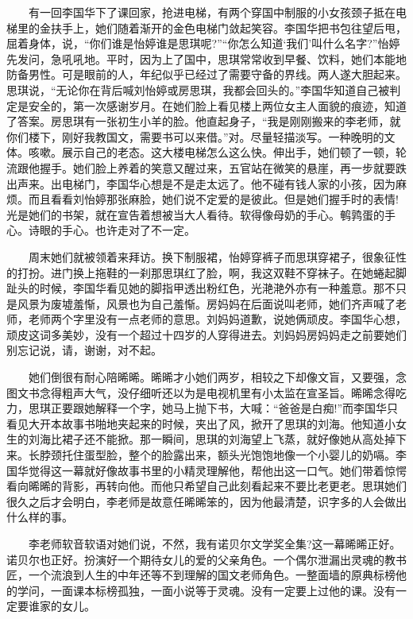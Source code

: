 \documentclass[12pt,UTF8]{ctexbook}
\begin{document}
　　有一回李国华下了课回家，抢进电梯，有两个穿国中制服的小女孩颈子抵在电梯里的金扶手上，她们随着渐开的金色电梯门敛起笑容。李国华把书包往望后甩，屈着身体，说，\enquote{你们谁是怡婷谁是思琪呢?}\enquote{你怎么知道`我们'叫什么名字?}怡婷先发问，急吼吼地。平时，因为上了国中，思琪常常收到早餐、饮料，她们本能地防备男性。可是眼前的人，年纪似乎已经过了需要守备的界线。两人遂大胆起来。思琪说，\enquote{无论你在背后喊刘怡婷或房思琪，我都会回头的。}李国华知道自己被判定是安全的，第一次感谢岁月。在她们脸上看见楼上两位女主人面貌的痕迹，知道了答案。房思琪有一张初生小羊的脸。他直起身子，\enquote{我是刚刚搬来的李老师，就你们楼下，刚好我教国文，需要书可以来借。}对。尽量轻描淡写。一种晚明的文体。咳嗽。展示自己的老态。这大楼电梯怎么这么快。伸出手，她们顿了一顿，轮流跟他握手。她们脸上养着的笑意又醒过来，五官站在微笑的悬崖，再一步就要跌出声来。出电梯门，李国华心想是不是走太远了。他不碰有钱人家的小孩，因为麻烦。而且看看刘怡婷那张麻脸，她们说不定爱的是彼此。但是她们握手时的表情!光是她们的书架，就在宣告着想被当大人看待。软得像母奶的手心。鹌鹑蛋的手心。诗眼的手心。也许走对了不一定。

　　周末她们就被领着来拜访。换下制服裙，怡婷穿裤子而思琪穿裙子，很象征性的打扮。进门换上拖鞋的一刹那思琪红了脸，啊，我这双鞋不穿袜子。在她蜷起脚趾头的时候，李国华看见她的脚指甲透出粉红色，光滟滟外亦有一种羞意。那不只是风景为废墟羞惭，风景也为自己羞惭。房妈妈在后面说叫老师，她们齐声喊了老师，老师两个字里没有一点老师的意思。刘妈妈道歉，说她俩顽皮。李国华心想，顽皮这词多美妙，没有一个超过十四岁的人穿得进去。刘妈妈房妈妈走之前要她们别忘记说，请，谢谢，对不起。

　　她们倒很有耐心陪晞晞。晞晞才小她们两岁，相较之下却像文盲，又要强，念图文书念得粗声大气，没仔细听还以为是电视机里有小太监在宣圣旨。晞晞念得吃力，思琪正要跟她解释一个字，她马上抛下书，大喊：\enquote{爸爸是白痴!}而李国华只看见大开本故事书啪地夹起来的时候，夹出了风，掀开了思琪的刘海。他知道小女生的刘海比裙子还不能掀。那一瞬间，思琪的刘海望上飞蒸，就好像她从高处掉下来。长脖颈托住蛋型脸，整个的脸露出来，额头光饱饱地像一个小婴儿的奶嗝。李国华觉得这一幕就好像故事书里的小精灵理解他，帮他出这一口气。她们带着惊愕看向晞晞的背影，再转向他。而他只希望自己此刻看起来不要比老更老。思琪她们很久之后才会明白，李老师是故意任晞晞笨的，因为他最清楚，识字多的人会做出什么样的事。

　　李老师软音软语对她们说，不然，我有诺贝尔文学奖全集?这一幕晞晞正好。诺贝尔也正好。扮演好一个期待女儿的爱的父亲角色。一个偶尔泄漏出灵魂的教书匠，一个流浪到人生的中年还等不到理解的国文老师角色。一整面墙的原典标榜他的学问，一面课本标榜孤独，一面小说等于灵魂。没有一定要上过他的课。没有一定要谁家的女儿。
\end{document}
